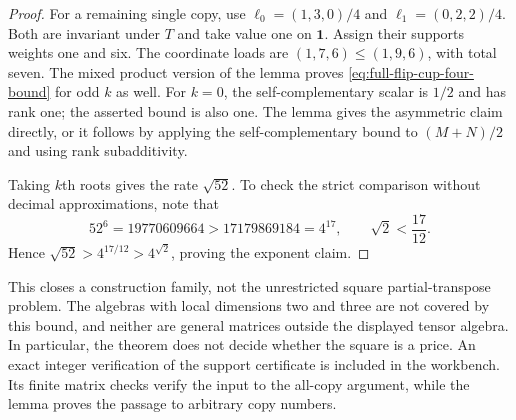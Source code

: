 \begin{proof}
For a remaining single copy, use
$\ell_0=(1,3,0)/4$ and $\ell_1=(0,2,2)/4$.
Both are invariant under $T$ and take value one on $\mathbf1$.
Assign their supports weights one and six. The coordinate loads
are $(1,7,6)\leq(1,9,6)$, with total seven. The mixed product
version of the lemma proves \eqref{eq:full-flip-cup-four-bound}
for odd $k$ as well. For $k=0$, the self-complementary scalar is
$1/2$ and has rank one; the asserted bound is also one.
The lemma gives the asymmetric claim directly, or it follows by
applying the self-complementary bound to $(M+N)/2$ and using rank
subadditivity.

Taking $k$th roots gives the rate $\sqrt{52}$. To check the strict
comparison without decimal approximations, note that
\[
 52^6=19770609664>17179869184=4^{17},
 \qquad \sqrt2<\frac{17}{12}.
\]
Hence $\sqrt{52}>4^{17/12}>4^{\sqrt2}$, proving the exponent claim.
\end{proof}

This closes a construction family, not the unrestricted square
partial-transpose problem. The algebras with local dimensions two
and three are not covered by this bound, and neither are general
matrices outside the displayed tensor algebra. In particular, the
theorem does not decide whether the square is a price. An exact integer verification of the support certificate is included
in the workbench. Its finite matrix checks verify the input to the
all-copy argument, while the lemma proves the passage to arbitrary
copy numbers.
